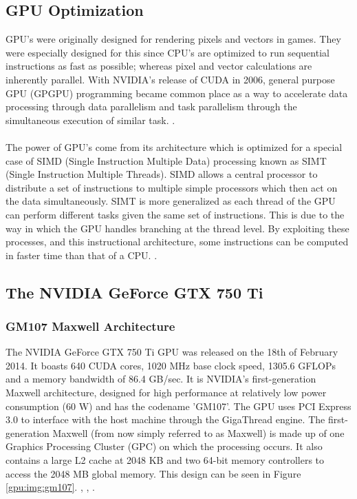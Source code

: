 \subsection{GPU Optimization}\label{gpu:sec:opt}
GPU's were originally designed for rendering pixels and vectors in games. They were especially designed for this since CPU's are optimized to run sequential instructions as fast as possible; whereas pixel and vector calculations are inherently parallel. With NVIDIA's release of CUDA in 2006, general purpose GPU (GPGPU) programming became common place as a way to accelerate data processing through data parallelism and task parallelism through the simultaneous execution of similar task. \cite{nvidia_cuda}.
\\
\\
The power of GPU's come from its architecture which is optimized for a special case of SIMD (Single Instruction Multiple Data) processing known as SIMT (Single Instruction Multiple Threads). SIMD allows a central processor to distribute a set of instructions to multiple simple processors which then act on the data simultaneously. SIMT is more generalized as each thread of the GPU can perform different tasks given the same set of instructions. This is due to the way in which the GPU handles branching at the thread level. By exploiting these processes, and this instructional architecture, some instructions can be computed in faster time than that of a CPU. \cite{vuduc2013brief}.
\subsection{The NVIDIA GeForce GTX 750 Ti}\label{gpu:sec:750}
%
\subsubsection{GM107 Maxwell Architecture}\label{gpu:ssec:max}
The NVIDIA GeForce GTX 750 Ti GPU was released on the 18th of February 2014. It boasts 640 CUDA cores, 1020 MHz base clock speed, 1305.6 GFLOPs and a memory bandwidth of 86.4 GB/sec. It is NVIDIA's first-generation Maxwell architecture, designed for high performance at relatively low power consumption (60 W) and has the codename 'GM107'. The GPU uses PCI Express 3.0 to interface with the host machine through the GigaThread engine. The first-generation Maxwell (from now simply referred to as Maxwell) is made up of one Graphics Processing Cluster (GPC) on which the processing occurs. It also contains a large L2 cache at 2048 KB and two 64-bit memory controllers to access the 2048 MB global memory. This design can be seen in Figure \ref{gpu:img:gm107}. \cite{geforce_750}, \cite{g750_specs}, \cite{g750_paper}.
%
